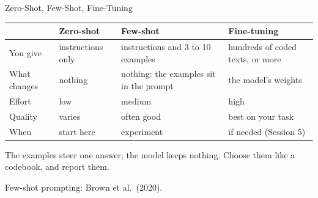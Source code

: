 \documentclass[svgnames,x11names,dvipsnames]{beamer}
\newcommand{\new}[1]{#1}
\begin{document}
\begin{frame}{\new{Zero-Shot, Few-Shot, Fine-Tuning}}
\centering
\scriptsize
\renewcommand{\arraystretch}{1.35}
\begin{tabular}{@{}>{\raggedright\arraybackslash}p{1.7cm}>{\raggedright\arraybackslash}p{2.6cm}>{\raggedright\arraybackslash}p{2.9cm}>{\raggedright\arraybackslash}p{2.6cm}@{}}
\toprule
& \textcolor{titleblue}{\textbf{Zero-shot}} & \textcolor{orange!80!black}{\textbf{Few-shot}} & \textcolor{green!45!black}{\textbf{Fine-tuning}} \\
\midrule
You give & instructions only & instructions and 3 to 10 examples & hundreds of coded texts, or more \\
What changes & nothing & nothing: the examples sit in the prompt & the model's weights \\
Effort & low & medium & high \\
Quality & varies & often good & best on your task \\
When & start here & experiment & if needed (Session 5) \\
\bottomrule
\end{tabular}

\vspace{0.35cm}
\raggedright
\setlength{\fboxsep}{5pt}

\vspace{0.3cm}
\small
The examples steer one answer; the model keeps nothing. Choose them like a codebook, and report them.

\vspace{0.05cm}
{\tiny Few-shot prompting: Brown et al.\ (2020).}
\end{frame}
\end{document}
